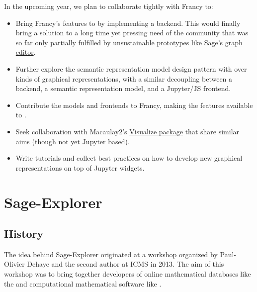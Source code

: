 \documentclass{deliverablereport}
\begin{document}
In the upcoming year, we plan to collaborate tightly with Francy to:
\begin{itemize}
\item Bring Francy's features to \Sage by implementing a backend. This
  would finally bring a solution to a long time yet pressing need of
  the community that was so far only partially fulfilled by
  unsustainable prototypes like Sage's
  \href{http://doc.sagemath.org/html/en/reference/graphs/sage/graphs/graph_editor.html}{graph editor}.
\item Further explore the semantic representation model design pattern
  with over kinds of graphical representations, with a similar
  decoupling between a \Sage backend, a semantic representation model,
  and a Jupyter/JS frontend.
\item Contribute the models and frontends to Francy, making the
  features available to \GAP.
\item Seek collaboration with Macaulay2's
  \href{http://www2.macaulay2.com/Macaulay2/doc/Macaulay2-1.11/share/doc/Macaulay2/Visualize/html/}{Visualize
    package} that share similar aims (though not yet Jupyter based).
\item Write tutorials and collect best practices on how to develop new
  graphical representations on top of Jupyter widgets.
\end{itemize}

\section{Sage-Explorer}
\label{section:sage-explorer}

\subsection{History}

The idea behind Sage-Explorer originated at a workshop organized by
Paul-Olivier Dehaye and the second author at ICMS in 2013. The aim of
this workshop was to bring together developers of online mathematical
databases like the \LMFDB and computational mathematical software like
\Sage.
\end{document}
